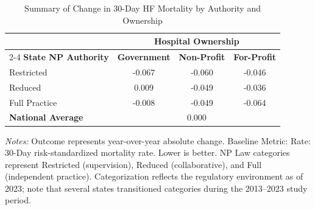 \begin{table}[htbp]
    \centering
    \caption{Summary of Change in 30-Day HF Mortality by Authority and Ownership}
    \label{tab:d_mortality_rate_hf}
    \vspace{0.2cm}
    \begin{tabular}{lccc}
        \toprule
        & \multicolumn{3}{c}{\textbf{Hospital Ownership}} \\
        \cmidrule(lr){2-4}
        \textbf{State NP Authority} & \textbf{Government} & \textbf{Non-Profit} & \textbf{For-Profit} \\
        \midrule
        Restricted & -0.067 & -0.060 & -0.046 \\
        Reduced & 0.009 & -0.049 & -0.036 \\
        Full Practice & -0.008 & -0.049 & -0.064 \\
        \midrule
        \textbf{National Average} & \multicolumn{3}{c}{0.000} \\
        \bottomrule
    \end{tabular}
    \vspace{0.1cm}
    \begin{minipage}{0.85\textwidth}
        \footnotesize \textit{Notes:} Outcome represents year-over-year absolute change. Baseline Metric: Rate: 30-Day risk-standardized mortality rate. Lower is better. NP Law categories represent Restricted (supervision), Reduced (collaborative), and Full (independent practice). Categorization reflects the regulatory environment as of 2023; note that several states transitioned categories during the 2013--2023 study period.
    \end{minipage}
\end{table}